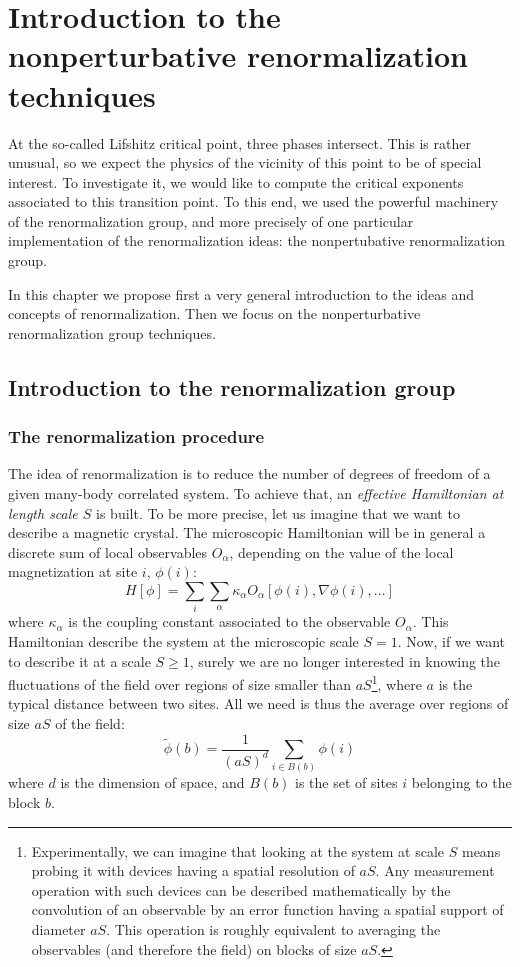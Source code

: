 \chapter{Introduction to the nonperturbative renormalization techniques}

At the so-called Lifshitz critical point, three phases intersect. This is rather unusual, so we expect the physics of the vicinity of this point to be of special interest. To investigate it, we would like to compute the critical exponents associated to this transition point. To this end, we used the powerful machinery of the renormalization group, and more precisely of one particular implementation of the renormalization ideas: the nonpertubative renormalization group.

In this chapter we propose first a very general introduction to the ideas and concepts of renormalization. Then we focus on the nonperturbative renormalization group techniques.

\section{Introduction to the renormalization group}

\subsection{The renormalization procedure}

The idea of renormalization is to reduce the number of degrees of freedom of a given many-body correlated system.
To achieve that, an \textit{effective Hamiltonian at length scale $S$} is built. 
To be more precise, let us imagine that we want to describe a magnetic crystal. The microscopic Hamiltonian will be in general a discrete sum of local observables $O_\alpha$, depending on the value of the local magnetization at site $i$, $\phi(i)$:
\begin{equation}
H[\phi] = \sum_i \sum_\alpha \kappa_\alpha O_\alpha[\phi(i), \nabla \phi(i), ...]
\end{equation}
where $\kappa_\alpha$ is the coupling constant associated to the observable $O_\alpha$. 
This Hamiltonian describe the system at the microscopic scale $S=1$. Now, if we want to describe it at a scale $S \geq 1$, surely we are no longer interested in knowing the fluctuations of the field over regions of size smaller than $a S$\footnote{Experimentally, we can imagine that looking at the system at scale $S$ means probing it with devices having a spatial resolution of $a S$. Any measurement operation with such devices can be described mathematically by the convolution of an observable by an error function having a spatial support of diameter $a S$. This operation is roughly equivalent to averaging the observables (and therefore the field) on blocks of size $a S$.}, where $a$ is the typical distance between two sites. All we need is thus the average over regions of size $a S$ of the field:
\begin{equation}
\tilde{\phi}(b) = \frac{1}{(aS)^d} \sum_{i \in B(b)} \phi(i)
\end{equation}
where $d$ is the dimension of space, and $B(b)$ is the set of sites $i$ belonging to the block $b$.

